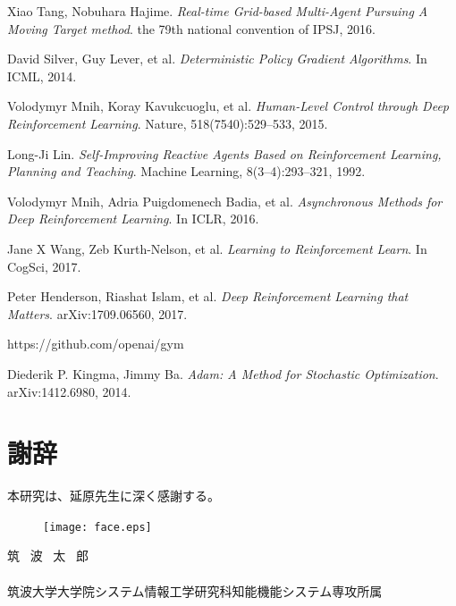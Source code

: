 \documentclass[11pt,twocolumn]{jarticle} %
\begin{document}
\begin{thebibliography}{9}
Xiao Tang, Nobuhara Hajime. \textsl{Real-time Grid-based Multi-Agent Pursuing A Moving Target method}. the 79th national convention of IPSJ, 2016. 

David Silver, Guy Lever, et al. \textsl{Deterministic Policy Gradient Algorithms}. In ICML, 2014.

Volodymyr Mnih, Koray Kavukcuoglu, et al. \textsl{Human-Level Control through Deep Reinforcement Learning}. Nature, 518(7540):529–533, 2015.

Long-Ji Lin. \textsl{Self-Improving Reactive Agents Based on Reinforcement Learning, Planning and Teaching}. Machine Learning, 8(3–4):293–321, 1992.

Volodymyr Mnih, Adria Puigdomenech Badia, et al. \textsl{Asynchronous Methods for Deep Reinforcement Learning}. In ICLR, 2016.

Jane X Wang, Zeb Kurth-Nelson, et al. \textsl{Learning to Reinforcement Learn}. In CogSci, 2017.

Peter Henderson, Riashat Islam, et al. \textsl{Deep Reinforcement Learning that Matters}. arXiv:1709.06560, 2017.

https://github.com/openai/gym

Diederik P. Kingma, Jimmy Ba. \textsl{Adam: A Method for Stochastic Optimization}. arXiv:1412.6980, 2014.

\section*{謝辞}
本研究は、延原先生に深く感謝する。
\vspace{2zh}
\begin{minipage}{73mm}
 \begin{figure} 
 \begin{center}
  \texttt{[image: face.eps]}
 \end{center}
 \end{figure}
 \noindent 筑 \ 波 \ 太 \  郎\\\\
 筑波大学大学院システム情報工学研究科知能機能システム専攻所属
\end{minipage}

\end{thebibliography}
\clearpage

\end{document}
